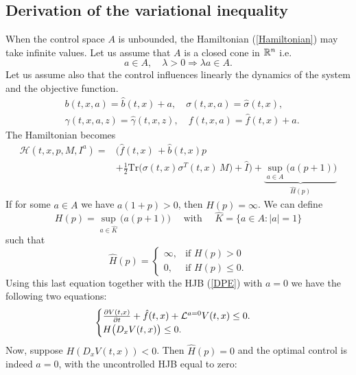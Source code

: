 \subsection{Derivation of the variational inequality}

When the control space $A$ is unbounded, the Hamiltonian (\ref{Hamiltonian}) may take infinite values. Let us assume that $A$ is a closed cone in $\mathbb{R}^n$ i.e. 
\begin{equation}\label{unbounded_set}
 a \in A, \quad \lambda > 0 \Longrightarrow \lambda a \in A.
\end{equation}
Let us assume also that the control influences linearly the dynamics of the system and the objective function.
\begin{align}\label{linear_control}
 & b(t,x,a) = \hat b(t,x) + a, \quad \sigma(t,x,a) = \hat \sigma(t,x), \\ 
 & \gamma(t,x,a,z) = \hat \gamma(t,x,z), \quad f(t,x,a) = \hat f(t,x) + a. 
\end{align}
The Hamiltonian becomes
\begin{align*}
 \mathcal{H}(t,x,p,M,I^a) =& \biggl( \hat f(t,x) \, + \hat b(t,x) p \\ \nonumber
              &+ \frac{1}{2} \mbox{Tr} \bigl( \sigma(t,x)\sigma^T(t,x) \, M \bigr) +\hat I \biggr) + \underbrace{\sup_{a \in A} \biggl( a(p + 1) \biggr) }_{\hat H(p)} 
\end{align*}
If for some $a\in A$ we have $a(1+p)>0$, then $\hat H(p) = \infty$. We can define 
\begin{equation}
 H(p) = \sup_{a \in \hat K} \biggl( a(p + 1) \biggr) \quad \mbox{ with } \quad \hat K = \{ a \in A: |a|=1 \}
\end{equation}
such that
\begin{equation}
\hat H(p) = \begin{cases} 
 \infty, & \mbox{if } H(p) >0 \\ 
  0,     & \mbox{if } H(p) \leq 0 . 
\end{cases} 
\end{equation}
Using this last equation together with the HJB (\ref{DPE}) with $a=0$ we have the following two equations:
\begin{equation}
\begin{cases}
 \frac{\partial V(t,x)}{\partial t} + \hat f(t,x) + \mathcal{L}^{a=0}V(t,x)  \leq 0. \\
 H\bigl( D_x V(t,x) \bigr) \leq 0.
\end{cases}
\end{equation}
Now, suppose $H(D_x V(t,x)) < 0$. Then $\hat H(p)=0$ and the optimal control is indeed $a=0$, with the uncontrolled HJB equal to zero:
